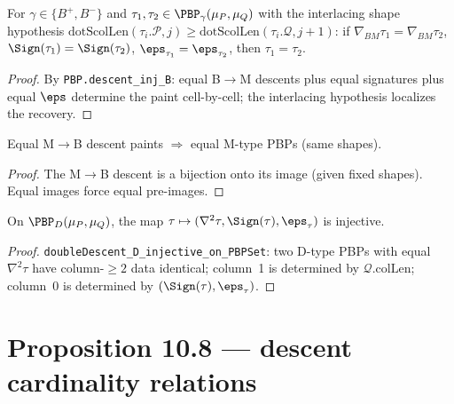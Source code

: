 \begin{lemma}
  \label{lem:10_4_B}
  \leanok
  For $\gamma \in \{B^+, B^-\}$ and $\tau_1, \tau_2 \in \PBP_\gamma(\mu_P, \mu_Q)$
  with the interlacing shape hypothesis $\mathrm{dotScolLen}(\tau_i.\mathcal{P}, j) \geq \mathrm{dotScolLen}(\tau_i.\mathcal{Q}, j + 1)$:
  if $\nabla_{BM}\tau_1 = \nabla_{BM}\tau_2$, $\Sign(\tau_1) = \Sign(\tau_2)$, $\eps_{\tau_1} = \eps_{\tau_2}$,
  then $\tau_1 = \tau_2$.
\end{lemma}
\begin{proof}
  \leanok
  By \texttt{PBP.descent\_inj\_B}: equal B$\to$M descents plus equal signatures plus equal $\eps$ determine the paint cell-by-cell; the interlacing hypothesis localizes the recovery.
\end{proof}


\begin{lemma}
  \label{lem:10_5_M}
  \leanok
  Equal M$\to$B descent paints $\Rightarrow$ equal M-type PBPs (same shapes).
\end{lemma}
\begin{proof}
  \leanok
  The M$\to$B descent is a bijection onto its image (given fixed shapes). Equal images force equal pre-images.
\end{proof}


\begin{lemma}
  \label{lem:10_5_D}
  \leanok
  On $\PBP_D(\mu_P, \mu_Q)$, the map $\tau \mapsto (\nabla^2\tau, \Sign(\tau), \eps_\tau)$ is injective.
\end{lemma}
\begin{proof}
  \leanok
  \texttt{doubleDescent\_D\_injective\_on\_PBPSet}: two D-type PBPs with equal $\nabla^2\tau$ have column-$\geq 2$ data identical; column~1 is determined by $\mathcal{Q}.\mathrm{colLen}$; column~0 is determined by $(\Sign(\tau), \eps_\tau)$.
\end{proof}


\section{Proposition 10.8 — descent cardinality relations}

